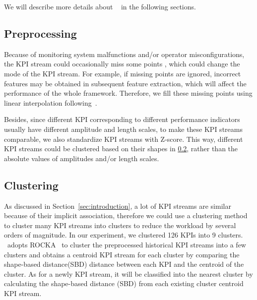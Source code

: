 
We will describe more details about \name~ in the following sections.
\par


\subsection{Preprocessing}
\label{subsubsec:preprocessing}
Because of monitoring system malfunctions and/or operator misconfigurations, the KPI stream could occasionally miss some points \cite{ADSarticle}, which could change the mode of the KPI stream. 
For example, if missing points are ignored, incorrect features may be obtained in subsequent feature extraction, which will affect the performance of the whole framework.
Therefore, we fill these missing points using linear interpolation following~\cite{lirobust}.
\par
Besides, since different KPI corresponding to different performance indicators usually have different amplitude and length scales, to make these KPI streams comparable, we also standardize KPI streams with Z-score.
This way, different KPI streams could be clustered based on their shapes in \ref{subsubsec:clustering}, rather than the absolute values of amplitudes and/or length scales.

\subsection{Clustering}
\label{subsubsec:clustering}
As discussed in Section~\ref{sec:introduction}, a lot of KPI streams are similar because of their implicit association, therefore we could use a clustering method to cluster many KPI streams into clusters to reduce the workload by several orders of magnitude. In our experiment, we clustered 126 KPIs into 9 clusters. \name~adopts ROCKA~\cite{lirobust} to cluster the preprocessed historical KPI streams into a few clusters and obtains a centroid KPI stream for each cluster by comparing the shape-based distance(SBD) distance between each KPI and the centroid of the cluster.
As for a newly KPI stream, it will be classified into the nearest cluster by calculating the shape-based distance (SBD) from each existing cluster centroid KPI stream.

